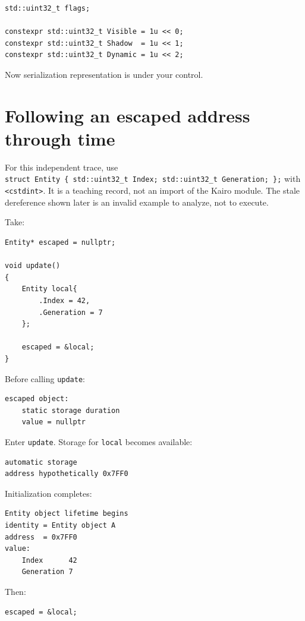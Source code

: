 \begin{verbatim}
std::uint32_t flags;

constexpr std::uint32_t Visible = 1u << 0;
constexpr std::uint32_t Shadow  = 1u << 1;
constexpr std::uint32_t Dynamic = 1u << 2;
\end{verbatim}

Now serialization representation is under your control.

\section{Following an escaped address through time}\label{01-foundations-i-ch003-following-an-escaped-address-through-time}

For this independent trace, use \texttt{struct\ Entity\ \{\ std::uint32\_t\ Index;\ std::uint32\_t\ Generation;\ \};} with \texttt{\textless{}cstdint\textgreater{}}. It is a teaching record, not an import of the Kairo module. The stale dereference shown later is an invalid example to analyze, not to execute.

Take:

\begin{verbatim}
Entity* escaped = nullptr;

void update()
{
    Entity local{
        .Index = 42,
        .Generation = 7
    };

    escaped = &local;
}
\end{verbatim}

Before calling \texttt{update}:

\begin{verbatim}
escaped object:
    static storage duration
    value = nullptr
\end{verbatim}

Enter \texttt{update}. Storage for \texttt{local} becomes available:

\begin{verbatim}
automatic storage
address hypothetically 0x7FF0
\end{verbatim}

Initialization completes:

\begin{verbatim}
Entity object lifetime begins
identity = Entity object A
address  = 0x7FF0
value:
    Index      42
    Generation 7
\end{verbatim}

Then:

\begin{verbatim}
escaped = &local;
\end{verbatim}

